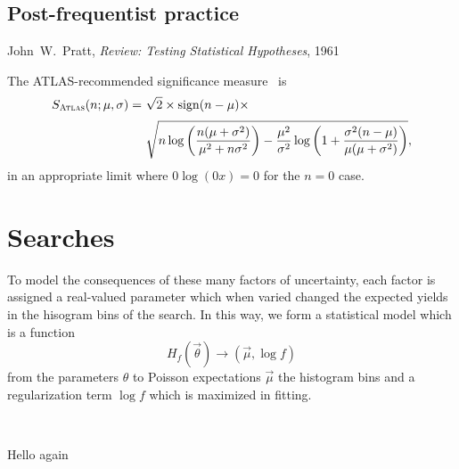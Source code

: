 \begin{singlespacing}
\section{Post-frequentist practice}
\label{sec:searches_practice}
\begin{epigraphs}
%
{John~W.~Pratt,
\textit{Review: Testing Statistical Hypotheses},
1961~\cite{pratt1961testing}}
\end{epigraphs}
\end{singlespacing}


The ATLAS-recommended significance measure~\cite{atlas_significance} is
\begin{align}
\label{eqn:significance_atlas}
S_\mathrm{\textsc{Atlas}}(n; \mu, \sigma) =~&
\sqrt{2} \times
\mathrm{sign}(n - \mu) \times
\\[0.2em] \nonumber
&
\sqrt{
n\log\left(\frac{n(\mu + \sigma^2)}{\mu^2 + n\sigma^2}\right)
- \frac{\mu^2}{\sigma^2}\log\left(
1 + \frac{\sigma^2(n - \mu)}{\mu(\mu + \sigma^2)}
\right)
}
,
\end{align}
in an appropriate limit where $0\log(0x) = 0$ for the $n=0$ case.


\section{Searches}
\label{sec:searches_searches}

To model the consequences of these many factors of uncertainty, each factor is
assigned a real-valued parameter which when varied changed the expected yields
in the hisogram bins of the search.
In this way, we form a statistical model which is a function
\begin{equation}
H_{\!f}(\vec \theta) \rightarrow (\vec \mu, \log f)
\end{equation}
from the parameters $\theta$ to Poisson expectations $\vec\mu$ the histogram
bins and a regularization term $\log f$ which is maximized in fitting.

\histfactory~\cite{cranmer2012histfactory}
\pyhf~\cite{heinrich2021pyhf}
\histfitter~\cite{Besjes_2015,baak2015histfitter}


\clearpage

Hello again
